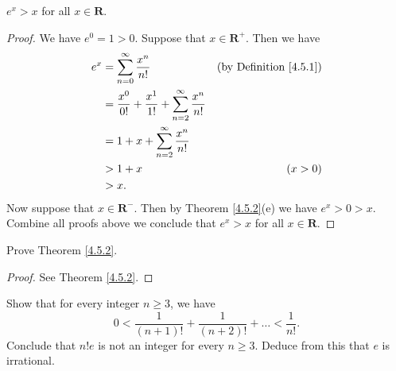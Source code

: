\begin{additional corollary}\label{ac 4.5.1}
\(e^x > x\) for all \(x \in \mathbf{R}\).
\end{additional corollary}

\begin{proof}
    We have \(e^0 = 1 > 0\).
    Suppose that \(x \in \mathbf{R}^+\).
    Then we have
    \begin{align*}
        e^x & = \sum_{n = 0}^\infty \frac{x^n}{n!}                                   & \text{(by Definition \ref{4.5.1})} \\
            & = \frac{x^0}{0!} + \frac{x^1}{1!} + \sum_{n = 2}^\infty \frac{x^n}{n!}                                      \\
            & = 1 + x + \sum_{n = 2}^\infty \frac{x^n}{n!}                                                                \\
            & > 1 + x                                                                & (x > 0)                            \\
            & > x.
    \end{align*}
    Now suppose that \(x \in \mathbf{R}^-\).
    Then by Theorem \ref{4.5.2}(e) we have \(e^x > 0 > x\).
    Combine all proofs above we conclude that \(e^x > x\) for all \(x \in \mathbf{R}\).
\end{proof}

\exercisesection

\begin{exercise}\label{ex 4.5.1}
    Prove Theorem \ref{4.5.2}.
\end{exercise}

\begin{proof}
    See Theorem \ref{4.5.2}.
\end{proof}

\begin{exercise}\label{ex 4.5.2}
    Show that for every integer \(n \geq 3\), we have
    \[
        0 < \frac{1}{(n + 1)!} + \frac{1}{(n + 2)!} + \dots < \frac{1}{n!}.
    \]
    Conclude that \(n! e\) is not an integer for every \(n \geq 3\).
    Deduce from this that \(e\) is irrational.
\end{exercise}

